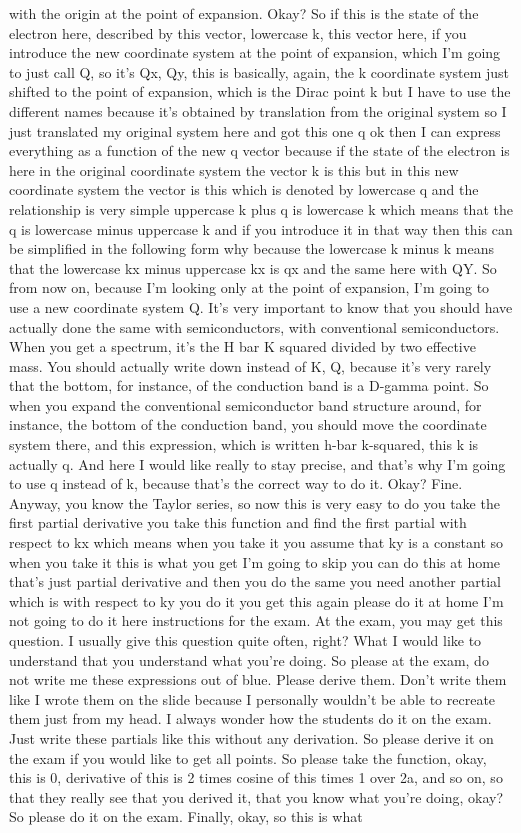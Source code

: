 with the origin at the point of expansion. Okay? So if this is the state of the electron here, described by this vector, lowercase k, this vector here, if you introduce the new coordinate system at the point of expansion, which I'm going to just call Q, so it's Qx, Qy, this is basically, again, the k coordinate system just shifted to the point of expansion, which is the Dirac point k but I have to use the different names because it's obtained by translation from the original system so I just translated my original system here and got this one q ok then I can express everything as a function of the new q vector because if the state of the electron is here in the original coordinate system the vector k is this but in this new coordinate system the vector is this which is denoted by lowercase q and the relationship is very simple uppercase k plus q is lowercase k which means that the q is lowercase minus uppercase k and if you introduce it in that way then this can be simplified in the following form why because the lowercase k minus k means that the lowercase kx minus uppercase kx is qx and the same here with QY. So from now on, because I'm looking only at the point of expansion, I'm going to use a new coordinate system Q. It's very important to know that you should have actually done the same with semiconductors, with conventional semiconductors. When you get a spectrum, it's the H bar K squared divided by two effective mass. You should actually write down instead of K, Q, because it's very rarely that the bottom, for instance, of the conduction band is a D-gamma point. So when you expand the conventional semiconductor band structure around, for instance, the bottom of the conduction band, you should move the coordinate system there, and this expression, which is written h-bar k-squared, this k is actually q. And here I would like really to stay precise, and that's why I'm going to use q instead of k, because that's the correct way to do it. Okay? Fine. Anyway, you know the Taylor series, so now this is very easy to do you take the first partial derivative you take this function and find the first partial with respect to kx which means when you take it you assume that ky is a constant so when you take it this is what you get I'm going to skip you can do this at home that's just partial derivative and then you do the same you need another partial which is with respect to ky you do it you get this again please do it at home I'm not going to do it here instructions for the exam. At the exam, you may get this question. I usually give this question quite often, right? What I would like to understand that you understand what you're doing. So please at the exam, do not write me these expressions out of blue. Please derive them. Don't write them like I wrote them on the slide because I personally wouldn't be able to recreate them just from my head. I always wonder how the students do it on the exam. Just write these partials like this without any derivation. So please derive it on the exam if you would like to get all points. So please take the function, okay, this is 0, derivative of this is 2 times cosine of this times 1 over 2a, and so on, so that they really see that you derived it, that you know what you're doing, okay? So please do it on the exam. Finally, okay, so this is what 